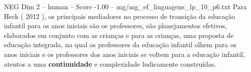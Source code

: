 \begin{textsample}{NEG Dim 2 – human – Score -1.00 – mg/mg\_ef\_linguagens\_lp\_10\_p6.txt}  \label{ex:f2_neg_009}
Para Heck ( 2012 ), os principais mediadores no processo de transição da educação infantil para os anos iniciais são os professores, são planejamentos efetivos, elaborados em conjunto com as crianças e para as crianças, uma proposta de educação integrada, na qual os professores da educação infantil olhem para os anos iniciais e os professores dos anos iniciais se voltem para a educação infantil, atentos a uma \textbf{continuidade} e complexidade ludicamente construídas.

\end{textsample}
